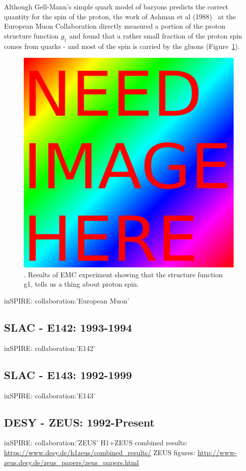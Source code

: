 Although Gell-Mann's simple quark model of baryons  \cite{Gell-Mann1961}
predicts the correct quantity for the spin of the proton, the work of Ashman et
al (1988)~\cite{Ashman1988} at the European Muon Collaboration directly measured a
portion of the proton structure function $g_1$ and found that a rather small
fraction of the proton spin comes from quarks - and most of the spin is carried
by the gluons (Figure~\ref{fig:emc_g1_result}).

\begin{figure}[ht]
	\begin{center}
		\includegraphics[width=0.5\linewidth]{./figures/filler/squareimg.png}
		\caption{
			 \needfig{}  \needcap{}. Results of EMC experiment showing that the
			structure function g1, tells us a thing about proton spin.
		}
		\label{fig:emc_g1_result}
	\end{center}
\end{figure}

inSPIRE: collaboration:'European Muon'

\subsection{SLAC - E142: 1993-1994}
inSPIRE: collaboration:'E142'

\subsection{SLAC - E143: 1992-1999} 
inSPIRE: collaboration:'E143'

\subsection{DESY - ZEUS: 1992-Present}
inSPIRE: collaboration:'ZEUS'
H1+ZEUS combined results: \url{https://www.desy.de/h1zeus/combined_results/}
ZEUS figures: \url{http://www-zeus.desy.de/zeus_papers/zeus_papers.html}

